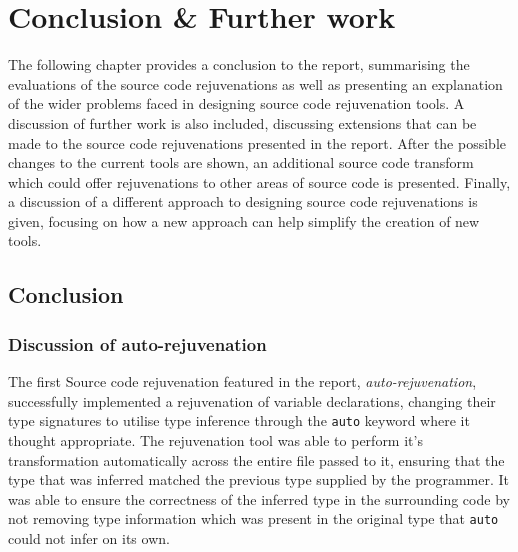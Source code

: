 \documentclass[bsc,frontabs,singlespacing,twoside,parskip,deptreport]{infthesis}
\begin{document}


\chapter{Conclusion \& Further work}
The following chapter provides a conclusion to the report, summarising the evaluations of the source code rejuvenations as well as presenting an explanation of the wider problems faced in designing source code rejuvenation tools. A discussion of further work is also included, discussing extensions that can be made to the source code rejuvenations presented in the report. After the possible changes to the current tools are shown, an additional source code transform which could offer rejuvenations to other areas of source code is presented. Finally, a discussion of a different approach to designing source code rejuvenations is given, focusing on how a new approach can help simplify the creation of new tools. 

\section{Conclusion}
\subsection{Discussion of auto-rejuvenation}

The first Source code rejuvenation featured in the report, \textit{auto-rejuvenation}, successfully implemented a rejuvenation of variable declarations, changing their type signatures to utilise type inference through the \texttt{auto} keyword where it thought appropriate. The rejuvenation tool was able to perform it's transformation automatically across the entire file passed to it, ensuring that the type that was inferred matched the previous type supplied by the programmer. It was able to ensure the correctness of the inferred type in the surrounding code by not removing type information which was present in the original type that \texttt{auto} could not infer on its own.
\end{document}

